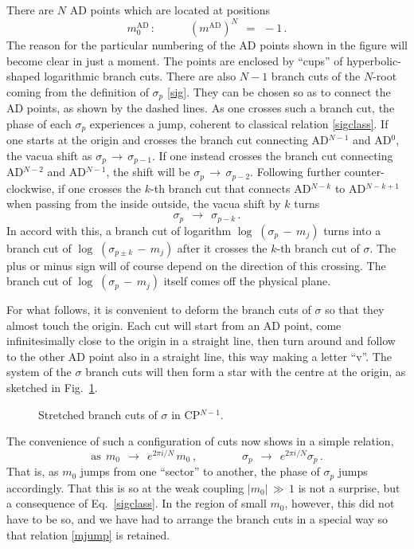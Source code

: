 \documentclass[epsfig,12pt]{article}
\def\beq{\begin{equation}}
\def\eeq{\end{equation}}
\def\beq{\begin{equation}}
\def\eeq{\end{equation}}
\begin{document}
	There are $ N $ AD points which are located at positions
\beq
	m_0^\text{AD} \,: \qquad\quad \left( m^\text{AD} \right)^N ~~=~~ -1 \,.
\eeq
	The reason for the particular numbering of the AD points shown in the figure will become clear in just a moment.
	The points are enclosed by ``cups'' of hyperbolic-shaped logarithmic branch cuts.
	There are also $ N - 1 $ branch cuts of the $ N $-root coming from the definition of $ \sigma_p $ \eqref{sig}.
	They can be chosen so as to connect the AD points, as shown by the dashed lines.
	As one crosses such a branch cut, the phase of each $ \sigma_p $ experiences a jump, 
	coherent to classical relation \eqref{sigclass}. 
	If one starts at the origin and crosses the branch cut connecting AD$^{N-1}$ and AD$^0$, 
	the vacua shift as $ \sigma_p \,\to\, \sigma_{p-1} $.
	If one instead crosses the branch cut connecting AD$^{N-2}$ and AD$^{N-1}$,
	the shift will be $ \sigma_p \,\to\, \sigma_{p-2} $.
	Following further counter-clockwise, if one crosses the $ k $-th branch cut 
	that connects AD$^{N-k}$ to AD$^{N-k+1}$ when passing from the inside outside, the vacua shift by $ k $ turns
\beq
\label{sigshift}
	\sigma_p ~~\to~~ \sigma_{p-k} \,.
\eeq
	In accord with this, a branch cut of logarithm $ \log\;( \sigma_p \,-\, m_j ) $ turns into 
	a branch cut of $ \log\;( \sigma_{p \pm k} \,-\, m_j ) $ after it crosses the $ k $-th branch cut of $ \sigma $. 
	The plus or minus sign will of course depend on the direction of this crossing. 
	The branch cut of $ \log\;( \sigma_p \,-\, m_j ) $ itself comes off the physical plane.

	For what follows, it is convenient to deform the branch cuts of $ \sigma $ so that they almost touch the origin.
	Each cut will start from an AD point, come infinitesimally close to the origin in a straight line, 
	then turn around and follow to the other AD point also in a straight line, this way making a letter ``v''.
	The system of the $ \sigma $ branch cuts will then form a star with the centre at the origin, as sketched in Fig.~\ref{fsigcpn}.
\begin{figure}
\begin{center}
\epsfxsize=8.0cm
\caption{Stretched branch cuts of $ \sigma $ in CP$^{N-1}$.}
\label{fsigcpn}
\end{center}
\end{figure}
	The convenience of such a configuration of cuts now shows in a simple relation,
\beq
\label{mjump}
	\text{as}~~ m_0 ~~\to~~ e^{2\pi i / N}\, m_0\,,  \qquad\qquad \sigma_p ~~\to~~ e^{2\pi i / N} \sigma_p\,.
\eeq
	That is, as $ m_0 $ jumps from one ``sector'' to another, the phase of $ \sigma_p $ jumps accordingly.
	That this is so at the weak coupling $ |m_0| \,\gg\, 1 $ is not a surprise, but a consequence of Eq.~\eqref{sigclass}.
	In the region of small $ m_0 $, however, this did not have to be so, and we have had to arrange the branch cuts 
	in a special way so that relation \eqref{mjump} is retained.
\end{document}
